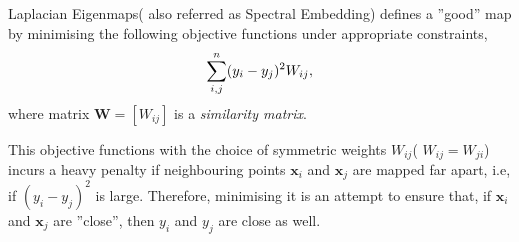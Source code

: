 \documentclass[portrait,final,a0paper,fontscale=0.277]{baposter}
\begin{document}
\begin{poster}
{\begin{multicols}{2}
 Laplacian Eigenmaps( also referred as Spectral Embedding) defines a ''good'' map by minimising the following objective functions under appropriate constraints,
 \begin{equation}
 \sum_{i,j}^n (y_i - y_j)^2 W_{ij}, \notag
 \end{equation}
 where matrix $\mathbf{W} = [W_{ij}]$ is a \emph{similarity matrix}. 
 
 This objective functions with the choice of symmetric weights $W_{ij}$( $W_{ij} = W_{ji}$) incurs a heavy penalty if neighbouring points $\bm{x}_i$ and $\bm{x}_j$ are mapped far apart, i.e, if $(y_i - y_j)^2$ is large. Therefore, minimising it is an attempt to ensure that, if $\bm{x}_i$ and $\bm{x}_j$ are ''close'', then $y_i$ and $y_j$ are close as well.
  \end{multicols}
   \vspace{0.3em}
  }

\end{poster}
\end{document}

